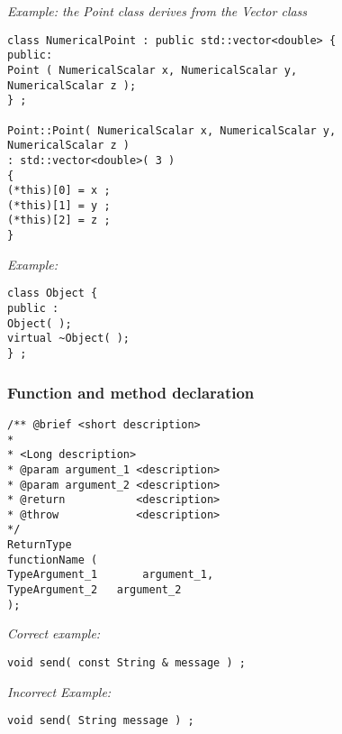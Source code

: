 \emph{Example: the Point class derives from the Vector class}
\lstset{language=C++, basicstyle=\normalsize}
\begin{lstlisting}[frame=TBRL]
class NumericalPoint : public std::vector<double> {
public:
Point ( NumericalScalar x, NumericalScalar y,
NumericalScalar z );
} ;

Point::Point( NumericalScalar x, NumericalScalar y,
NumericalScalar z )
: std::vector<double>( 3 )
{
(*this)[0] = x ;
(*this)[1] = y ;
(*this)[2] = z ;
}
\end{lstlisting}


\emph{Example:}
\lstset{language=C++, basicstyle=\normalsize}
\begin{lstlisting}[frame=TBRL]
class Object {
public :
Object( );
virtual ~Object( );
} ;
\end{lstlisting}

\subsubsection{Function and method declaration}


\lstset{language=C++, basicstyle=\normalsize}
\begin{lstlisting}[frame=TBRL]
/** @brief <short description>
*
* <Long description>
* @param argument_1 <description>
* @param argument_2 <description>
* @return           <description>
* @throw            <description>
*/
ReturnType
functionName (
TypeArgument_1       argument_1,
TypeArgument_2   argument_2
);
\end{lstlisting}


\emph{Correct example:}
\begin{lstlisting}[frame=TBRL]
void send( const String & message ) ;
\end{lstlisting}
\emph{Incorrect Example:}
\begin{lstlisting}[frame=TBRL]
void send( String message ) ;
\end{lstlisting}

